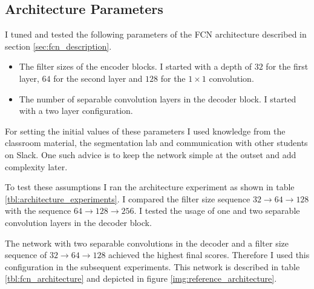 \documentclass[11pt, onecolumn, oneside, reqno]{article}
\begin{document}
\subsection{Architecture Parameters}
\label{sec:reference_architecture}
I tuned and tested the following parameters of the FCN architecture described in section \ref{sec:fcn_description}.
\begin{itemize}
\item The filter sizes of the encoder blocks. I started with a depth of $32$ for the first layer, $64$ for the second layer and $128$ for the $1 \times 1$ convolution. 
\item The number of separable convolution layers in the decoder block. I started with a two layer configuration.
\end{itemize}

For setting the initial values of these parameters I used knowledge from the classroom material, the segmentation lab and communication with other students on Slack. One such advice is to keep the network simple at the outset and add complexity later. 

To test these assumptions I ran the architecture experiment as shown in table \ref{tbl:architecture_experiments}. I compared the filter size sequence $32 \rightarrow 64 \rightarrow 128$ with the sequence $64 \rightarrow 128 \rightarrow 256$. I tested the usage of one and two separable convolution layers in the decoder block.

The network with two separable convolutions in the decoder and a filter size sequence of $32 \rightarrow 64 \rightarrow 128$ achieved the highest final scores.  Therefore I used this configuration in the subsequent experiments. This network is described in table \ref{tbl:fcn_architecture} and depicted in figure \ref{img:reference_architecture}.
\end{document}
